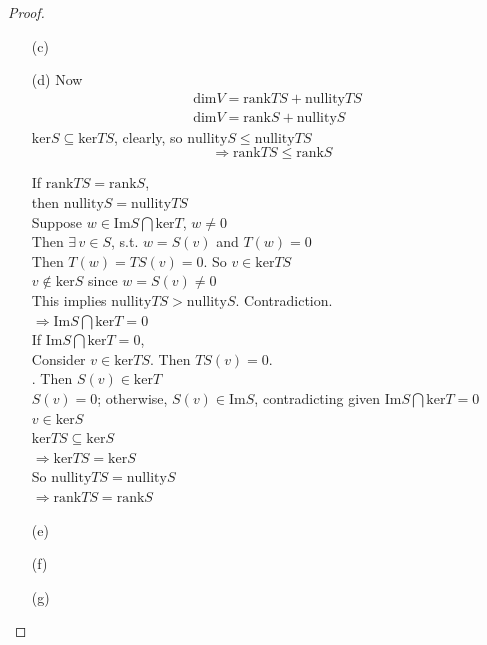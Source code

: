\documentclass[10pt]{amsart}
\begin{document}
\begin{multicols*}{2}
\begin{proof}
\begin{enumerate}
		\item[(c)]
		\item[(d)] Now 
		\[
		\begin{aligned}
		& \text{dim}V = \text{rank}TS + \text{nullity}TS \\ 
		&  \text{dim}V = \text{rank}S + \text{nullity}S
		\end{aligned}
		\]
		$\text{ker}S \subseteq \text{ker}TS$, clearly, so $\text{nullity}S \leq \text{nullity}TS$ 
		\[
		\Longrightarrow \boxed{ \text{rank}TS \leq \text{rank}S } 
		\]
		
		If $\text{rank}TS = \text{rank}S$, \\
		\phantom{ \quad } then $\text{nullity}S = \text{nullity}TS$ \\
		\phantom{ \, } Suppose $w \in \text{Im}S \bigcap \text{ker}T$, $w \neq 0$ \\
		\phantom{ \quad } Then $\exists \,  v\in S$, s.t. $w = S(v)$ and $T(w)=0$ \\
		\phantom{ \quad \, } Then $T(w) = TS(v) =0$.  So $v\in \text{ker}TS$ \\
		\phantom{ \quad \quad \, } $v\notin \text{ker}S$ since $w = S(v) \neq 0$ \\
		\phantom{ \quad \quad \, } This implies $\text{nullity}TS > \text{nullity}S$.  Contradiction. \\
		$\Longrightarrow \text{Im}S \bigcap \text{ker}T =0$ \\
		
		If $\text{Im}S \bigcap \text{ker}T =0$, \\
		\phantom{ \quad } Consider $v \in \text{ker}TS$.  Then $TS(v)=0$.  \\
		.  Then $S(v)  \in \text{ker}T$ \\
		\phantom{ \quad  } $S(v) =0$; otherwise, $S(v) \in \text{Im}S$, contradicting given $\text{Im}S \bigcap \text{ker}T =0$ \\
		\phantom{ \quad \quad } $v\in \text{ker}S$ \\
		
		$\text{ker}TS \subseteq \text{ker}S$\\
		$\Longrightarrow \text{ker}TS = \text{ker}S$ \\
		So $\text{nullity}TS = \text{nullity}S$  \\
		$\Longrightarrow \text{rank}TS = \text{rank}S$ 
		
		\item[(e)]
		\item[(f)]
		\item[(g)]
	\end{enumerate}
\end{proof}


\end{multicols*}
\end{document}
